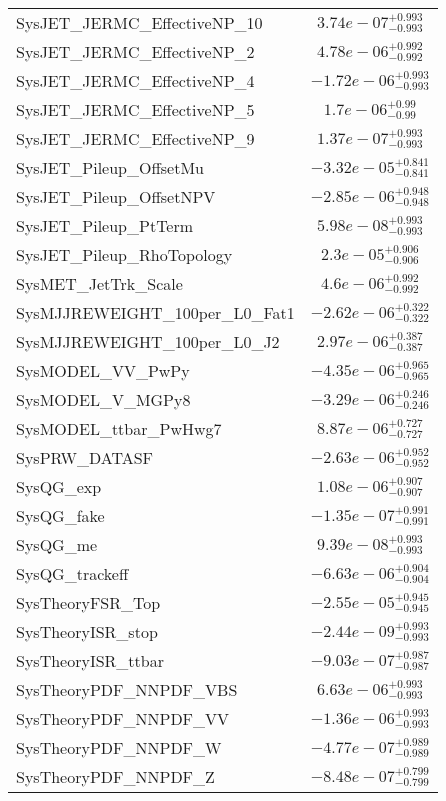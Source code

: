 \begin{tabular}{|l|c|}
SysJET\_JERMC\_EffectiveNP\_10 & $3.74e-07^{+0.993}_{-0.993}$ \\
SysJET\_JERMC\_EffectiveNP\_2 & $4.78e-06^{+0.992}_{-0.992}$ \\
SysJET\_JERMC\_EffectiveNP\_4 & $-1.72e-06^{+0.993}_{-0.993}$ \\
SysJET\_JERMC\_EffectiveNP\_5 & $1.7e-06^{+0.99}_{-0.99}$ \\
SysJET\_JERMC\_EffectiveNP\_9 & $1.37e-07^{+0.993}_{-0.993}$ \\
SysJET\_Pileup\_OffsetMu & $-3.32e-05^{+0.841}_{-0.841}$ \\
SysJET\_Pileup\_OffsetNPV & $-2.85e-06^{+0.948}_{-0.948}$ \\
SysJET\_Pileup\_PtTerm & $5.98e-08^{+0.993}_{-0.993}$ \\
SysJET\_Pileup\_RhoTopology & $2.3e-05^{+0.906}_{-0.906}$ \\
SysMET\_JetTrk\_Scale & $4.6e-06^{+0.992}_{-0.992}$ \\
SysMJJREWEIGHT\_100per\_L0\_Fat1 & $-2.62e-06^{+0.322}_{-0.322}$ \\
SysMJJREWEIGHT\_100per\_L0\_J2 & $2.97e-06^{+0.387}_{-0.387}$ \\
SysMODEL\_VV\_PwPy & $-4.35e-06^{+0.965}_{-0.965}$ \\
SysMODEL\_V\_MGPy8 & $-3.29e-06^{+0.246}_{-0.246}$ \\
SysMODEL\_ttbar\_PwHwg7 & $8.87e-06^{+0.727}_{-0.727}$ \\
SysPRW\_DATASF & $-2.63e-06^{+0.952}_{-0.952}$ \\
SysQG\_exp & $1.08e-06^{+0.907}_{-0.907}$ \\
SysQG\_fake & $-1.35e-07^{+0.991}_{-0.991}$ \\
SysQG\_me & $9.39e-08^{+0.993}_{-0.993}$ \\
SysQG\_trackeff & $-6.63e-06^{+0.904}_{-0.904}$ \\
SysTheoryFSR\_Top & $-2.55e-05^{+0.945}_{-0.945}$ \\
SysTheoryISR\_stop & $-2.44e-09^{+0.993}_{-0.993}$ \\
SysTheoryISR\_ttbar & $-9.03e-07^{+0.987}_{-0.987}$ \\
SysTheoryPDF\_NNPDF\_VBS & $6.63e-06^{+0.993}_{-0.993}$ \\
SysTheoryPDF\_NNPDF\_VV & $-1.36e-06^{+0.993}_{-0.993}$ \\
SysTheoryPDF\_NNPDF\_W & $-4.77e-07^{+0.989}_{-0.989}$ \\
SysTheoryPDF\_NNPDF\_Z & $-8.48e-07^{+0.799}_{-0.799}$ \\

\end{tabular}
